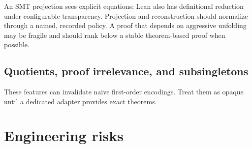 \documentclass[11pt,letterpaper,openany]{report}
\begin{document}
An SMT projection sees explicit equations; Lean also has definitional reduction under
configurable transparency. Projection and reconstruction should normalize through a
named, recorded policy. A proof that depends on aggressive unfolding may be fragile
and should rank below a stable theorem-based proof when possible.

\subsection{Quotients, proof irrelevance, and subsingletons}

These features can invalidate naive first-order encodings. Treat them as opaque until a
dedicated adapter provides exact theorems.

\section{Engineering risks}
\end{document}
